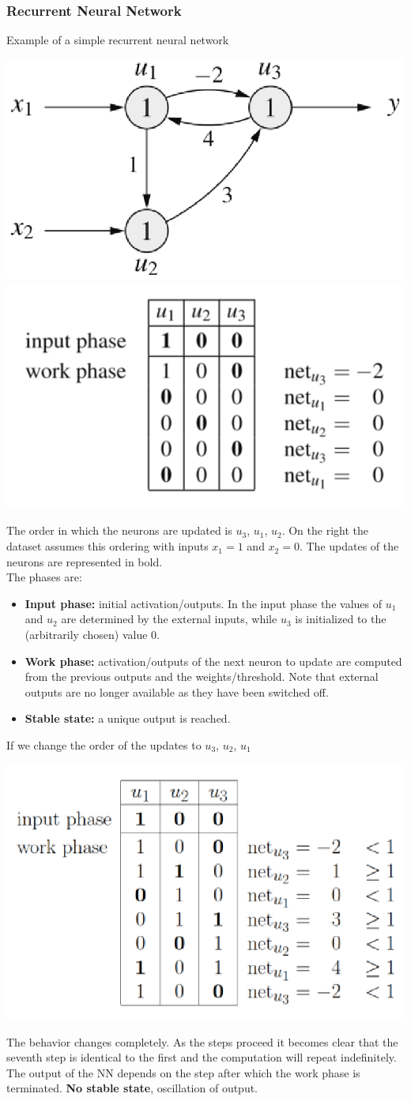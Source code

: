 \newpage

\subsubsection{Recurrent Neural Network}
Example of a simple recurrent neural network
\begin{center}
	\includegraphics[width=0.45\columnwidth]{img/NN/RNN1}
	\includegraphics[width=0.45\columnwidth]{img/NN/RNN2}
\end{center}
The order in which the neurons are updated is $u_3$, $u_1$, $u_2$. On the right the dataset assumes this ordering with inputs $x_1 = 1$ and $x_2 = 0$. The updates of the neurons are represented in bold. \\

The phases are: 
\begin{itemize}
	\item \textbf{Input phase:} initial activation/outputs. In the input phase the values of $u_1$ and $u_2$ are determined by the external inputs, while $u_3$ is initialized to the (arbitrarily chosen) value 0.
	\item \textbf{Work phase:} activation/outputs of the next neuron to update are computed from the previous outputs and the weights/threshold. Note that external outputs are no longer available as they have been switched off.
	\item \textbf{Stable state:} a unique output is reached.
\end{itemize}

If we change the order of the updates to $u_3$, $u_2$, $u_1$
\begin{center}
	\includegraphics[width=0.45\columnwidth]{img/NN/RNN3}
\end{center}
The behavior changes completely. As the steps proceed it becomes clear that the seventh step is identical to the first and the computation will repeat indefinitely. The output of the NN depends on the step after which the work phase is terminated. \textbf{No stable state}, oscillation of output.\\

